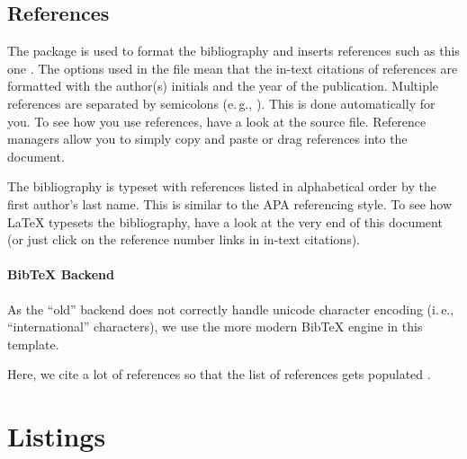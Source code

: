 \subsection{References}

The  package is used to format the bibliography and inserts references such as this one \parencite{murdoch_steven_j._chip_2010}. The options used in the  file mean that the in-text citations of references are formatted with the author(s) initials and the year \cite{anderson_ross_emv:_2014} of the publication. Multiple references are separated by semicolons (e.\,g., \cite{solat_security_2017, bond_chip_2014}). This is done automatically for you. To see how you use references, have a look at the  source file. Reference managers allow you to simply copy and paste or drag references into the document.

The bibliography is typeset with references listed in alphabetical order by the first author's last name. This is similar to the APA referencing style. To see how LaTeX typesets the bibliography, have a look at the very end of this document (or just click on the reference number links in in-text citations).

\paragraph{BibTeX Backend}

As the ``old''  backend does not correctly handle unicode character encoding (i.\,e., ``international'' characters), we use the more modern  BibTeX engine in this template.

Here, we cite a lot of references so that the list of references gets populated \cite{murdoch_steven_j._chip_2010,anderson_ross_emv:_2014,kou_weidong_secure_2003,solat_security_2017,bond_chip_2014,ortiz_s._is_2006,haselsteiner_security_2006,galloway_visa_2019,zhou_nshield_2014,lalehTaxonomyFraudsFraud2009,ferradiWhenOrganizedCrime2016,emvco_emvco_website,emvco_emvco_book1,emvco_emvco_book2,emvco_emvco_book3,emvco_emvco_book4,Yang10,Kopsell06,VilaGM03,Herrmann12-ipv6prefix,Herrmann14-diss,HBF:2013,Herrmann11-NordSec,AcarEEJND14,Herrmann09,WangG13,Raymond00,Hintz02,Herrmann14-encdns,FederrathFHP11,Goodson12-privacy,Fabian10,Google12,goldberg97,WendolskyHF07,chaum81,BertholdFK00,Dingledine04,rfc5246,LoesingMD10,FuchsHF13}.

\section{Listings}

